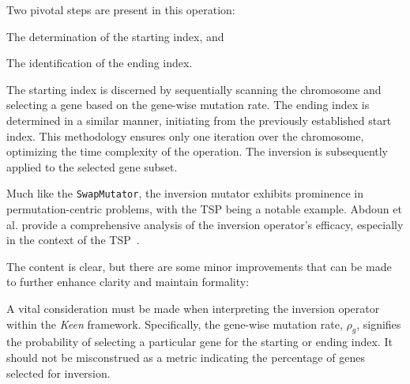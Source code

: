   Two pivotal steps are present in this operation: 
  \begin{enumerate*}
    \item The determination of the starting index, and
    \item The identification of the ending index.
  \end{enumerate*}

  The starting index is discerned by sequentially scanning the chromosome and 
  selecting a gene based on the gene-wise mutation rate. The ending index is 
  determined in a similar manner, initiating from the previously established 
  start index. This methodology ensures only one iteration over the chromosome, 
  optimizing the time complexity of the operation. The inversion is 
  subsequently applied to the selected gene subset.

  Much like the \texttt{SwapMutator}, the inversion mutator exhibits prominence 
  in permutation-centric problems, with the TSP being a notable example. Abdoun 
  et al. provide a comprehensive analysis of the inversion operator's efficacy, 
  especially in the context of the TSP~\autocite{abdounAnalyzingPerformanceMutation2012}.

  The content is clear, but there are some minor improvements that can be made to further enhance clarity and maintain formality:

  \begin{remark}
    A vital consideration must be made when interpreting the inversion operator 
    within the \textit{Keen} framework. Specifically, the gene-wise mutation 
    rate, \(\rho_g\), signifies the probability of selecting a particular gene 
    for the starting or ending index. It should not be misconstrued as a metric 
    indicating the percentage of genes selected for inversion.
  \end{remark}
